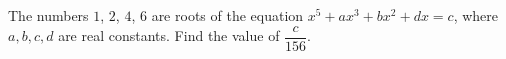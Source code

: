 The numbers $1$, $2$, $4$, $6$ are roots of the equation $x^5+ax^3+bx^2+dx=c$, where $a,b,c,d$ are real constants. Find the value of $\dfrac{c}{156}$.
